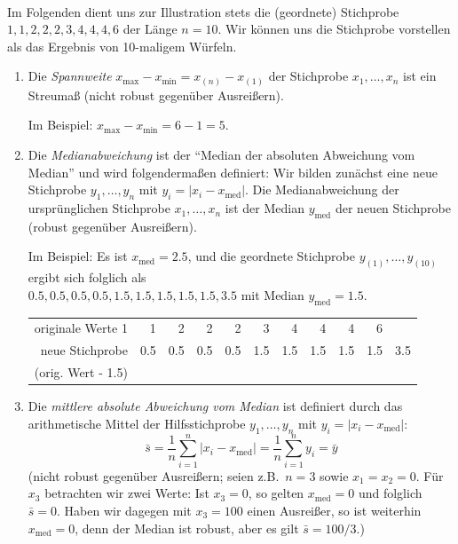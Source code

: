 \begin{bsp}
     \\
    Im Folgenden dient uns zur Illustration stets die (geordnete) Stichprobe $1,1,2,2,2,3,4,4,4,6$ der Länge $n=10$.
    Wir können uns die Stichprobe vorstellen als das Ergebnis von 10-maligem Würfeln.

    \begin{enumerate}[label=(\alph*)]
        \item Die \emph{Spannweite} $x_{\max}-x_{\min} = x_{(n)}-x_{(1)}$ der Stichprobe $x_1,\dots,x_n$ ist ein \gls{Streumaß} (nicht robust gegenüber Ausreißern).

        Im Beispiel: $x_{\max}-x_{\min} = 6-1=5$.

        \item Die \emph{Medianabweichung} ist der ``Median der absoluten Abweichung vom Median'' und wird folgendermaßen definiert: Wir bilden zunächst eine neue Stichprobe $y_1,\dots,y_n$ mit $y_i = |x_i-x_{\mathrm{med}}|$.
        Die Medianabweichung der ursprünglichen Stichprobe $x_1,\dots,x_n$ ist der Median $y_{\mathrm{med}}$ der neuen Stichprobe (robust gegenüber Ausreißern).

        Im Beispiel: Es ist $x_{\mathrm{med}}=2.5$, und die geordnete Stichprobe $y_{(1)},\dots,y_{(10)}$ ergibt
        sich folglich als \\ $0.5,0.5,0.5,0.5 , 1.5,1.5 , 1.5,1.5 , 1.5,3.5$ mit Median $y_{\mathrm{med}}=1.5$.

        \begin{tabular}{rrrrrrrrrrr}
            \color{Fuchsia}
            originale Werte 1 & 1 & 2 & 2 & 2 & 3 & 4 & 4 & 4 & 6 \\
            neue Stichprobe & 0.5 & 0.5 & 0.5 & 0.5 & 1.5 & 1.5 & 1.5 & 1.5 & 1.5 & 3.5  \\
            (orig. Wert - 1.5)
        \end{tabular}  \color{black}
        \item Die \emph{mittlere absolute Abweichung vom Median} ist definiert durch das arithmetische Mittel der Hilfsstichprobe $y_1,\dots,y_n$ mit $y_i=|x_i-x_{\mathrm{med}}|$:
        \[
            \bar s = \frac1n\sum_{i=1}^n |x_i-x_{\mathrm{med}}| = \frac1n\sum_{i=1}^n y_i = \bar y
        \]
        (nicht robust gegenüber Ausreißern; seien z.B.\ $n=3$ sowie $x_1=x_2=0$.
        Für $x_3$ betrachten wir zwei Werte: Ist $x_3=0$, so gelten $x_{\mathrm{med}}=0$ und folglich $\bar s=0$.
        Haben wir dagegen mit $x_3=100$ einen Ausreißer, so ist weiterhin $x_{\mathrm{med}}=0$, denn der Median ist robust, aber es gilt $\bar s = 100/3$.)


\end{enumerate}
\end{bsp}
